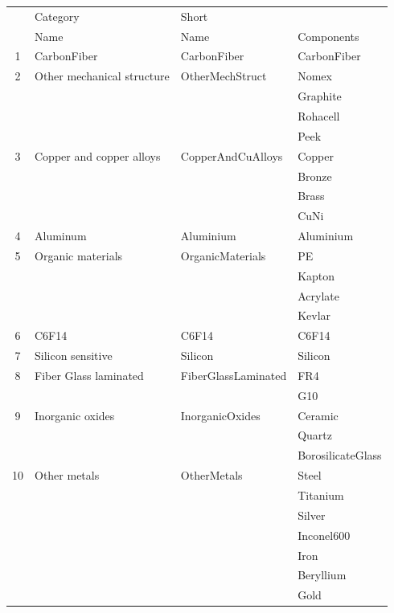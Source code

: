 \documentclass{cmspaper}
\begin{document}
\begin{table}[h]
\begin{center}
\begin{tabular}{clll}
  & Category    & Short       &           \\ 
  & Name        & Name        & Components \\
  \hline 
  1 & CarbonFiber & CarbonFiber & CarbonFiber \\
  \hline 
  2 & Other mechanical structure & OtherMechStruct & Nomex \\
  & &             & Graphite \\
  & &            & Rohacell \\
  & &             & Peek   \\
  \hline 
  3 & Copper and copper alloys & CopperAndCuAlloys & Copper \\
  & & &              Bronze \\
  & & &                 Brass \\
  & & &           CuNi \\
  \hline 
  4 & Aluminum & Aluminium & Aluminium \\ 
  \hline 
  5 & Organic materials & OrganicMaterials & PE \\
  & & &               Kapton \\
  & & &       Acrylate \\
  & & &  Kevlar \\
  \hline 
6 & C6F14 & C6F14 & C6F14 \\
  \hline 
7 & Silicon sensitive & Silicon & Silicon \\
  \hline 
8 & Fiber Glass laminated & FiberGlassLaminated & FR4 \\
& & &                  G10 \\
  \hline 
9 & Inorganic oxides & InorganicOxides & Ceramic \\
& & &               Quartz \\
& & &    BorosilicateGlass \\
  \hline 
10 & Other metals & OtherMetals &  Steel \\
& & &             Titanium \\
 & & &              Silver \\
  & & &         Inconel600 \\
 & & &                Iron \\
 & & &           Beryllium \\
 & & &                Gold \\
  \hline 

\end{tabular}
\end{center}
\end{table}
\end{document}
